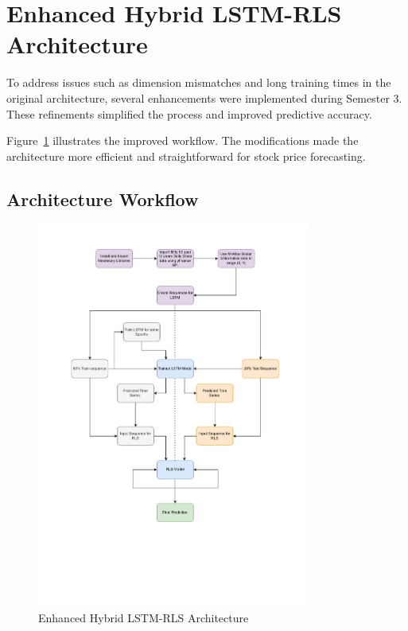 \section{Enhanced Hybrid LSTM-RLS Architecture}

To address issues such as dimension mismatches and long training times in the original architecture, several enhancements were implemented during Semester 3. These refinements simplified the process and improved predictive accuracy.

Figure~\ref{fig:Refinedarch} illustrates the improved workflow. The modifications made the architecture more efficient and straightforward for stock price forecasting.

\subsection{Architecture Workflow}

\begin{figure}[htbp]
    \centering
    \includegraphics[width=0.8\textwidth]{Images/RefinedArchitecture.pdf} %
    \caption{Enhanced Hybrid LSTM-RLS Architecture}
    \label{fig:Refinedarch}
\end{figure}

